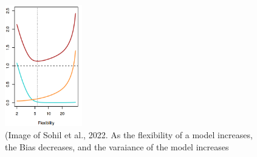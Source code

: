 \begin{figure}[h]
\label{MSEVarianceBias}
\caption{  
(Image of Sohil et al., 2022. As the flexibility of a model increases, the Bias decreases, and the varaiance of the model increases}
\centering
\includegraphics[width=0.3\textwidth]{MSEdependsonVarianceandBias}
\end{figure}

